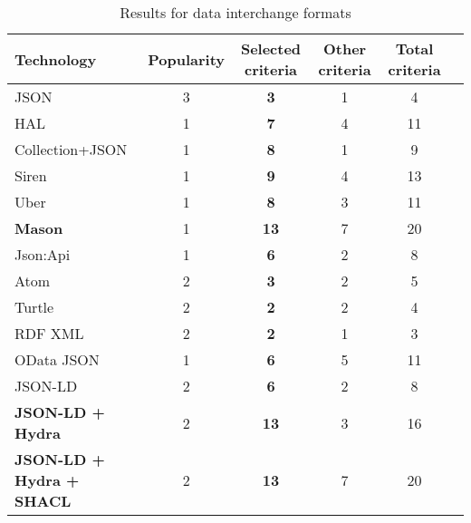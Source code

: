 \begin{table*}[h]
\begin{minipage}[t]{0.5\linewidth}
\begin{tabular}{|l|c|c|c|c|c|}
 \hline
 \textbf{Technology} & \textbf{Popularity} & \textbf{Selected criteria} & \textbf{Other criteria} & \textbf{Total criteria} \\
 \hline
 JSON & 3 & \textbf{3} & 1 & 4 \\
 HAL & 1 & \textbf{7} & 4 & 11 \\
 Collection+JSON & 1 & \textbf{8} & 1 & 9 \\
 Siren & 1 & \textbf{9} & 4 & 13 \\
 Uber & 1 & \textbf{8} & 3 & 11 \\
 \rowcolor{lightGreen} \textbf{Mason} & 1 & \textbf{13} & 7 & 20 \\
 Json:Api & 1 & \textbf{6} & 2 & 8 \\
 Atom & 2 & \textbf{3} & 2 & 5 \\
 Turtle & 2 & \textbf{2} & 2 & 4 \\
 RDF XML & 2 & \textbf{2} & 1 & 3 \\
 OData JSON & 1 & \textbf{6} & 5 & 11 \\
 JSON-LD & 2 & \textbf{6} & 2 & 8 \\
 \rowcolor{lightGreen} \textbf{JSON-LD + Hydra} & 2 & \textbf{13} & 3 & 16 \\
 \rowcolor{lightGreen} \textbf{JSON-LD + Hydra + SHACL} & 2 & \textbf{13} & 7 & 20 \\
 \hline
\end{tabular}
\caption{Results for data interchange formats}
\label{example-dif-results}
\end{minipage}
\end{table*}